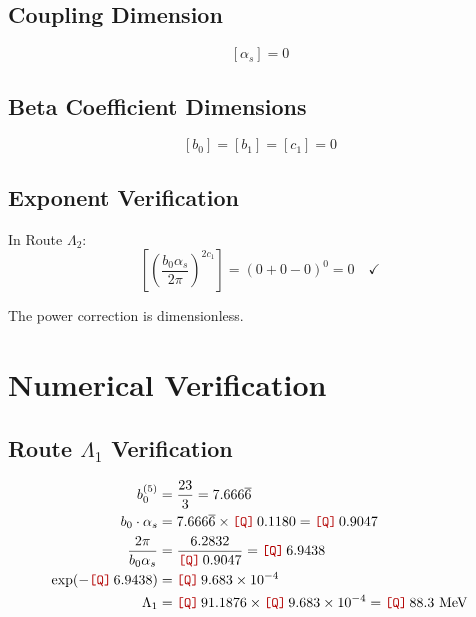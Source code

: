 \documentclass[11pt,a4paper]{article}
\newcommand{\Qnum}[1]{\textcolor{red!70!black}{\texttt{[Q]}}\,#1}
\theoremstyle{definition}
\begin{document}
\subsection{Coupling Dimension}
\label{subsec:app-dim-alpha}

\begin{equation}
\label{eq:app-dim-alpha}
[\alpha_s] = 0
\end{equation}

\subsection{Beta Coefficient Dimensions}
\label{subsec:app-dim-beta}

\begin{equation}
\label{eq:app-dim-beta}
[b_0] = [b_1] = [c_1] = 0
\end{equation}

\subsection{Exponent Verification}
\label{subsec:app-dim-exp}

In Route $\Lambda_2$:
\begin{equation}
\label{eq:app-dim-exp-check}
\left[\left(\frac{b_0\alpha_s}{2\pi}\right)^{2c_1}\right]
  = (0 + 0 - 0)^0 = 0 \quad \checkmark
\end{equation}

The power correction is dimensionless.

\section{Numerical Verification}
\label{app:numerical}

\subsection{Route $\Lambda_1$ Verification}
\label{subsec:app-lambda1-verify}

\begin{quarantinebox}
\begin{align}
\label{eq:app-num-1}
b_0^{(5)} &= \frac{23}{3} = 7.666\overline{6} \\
\label{eq:app-num-2}
b_0 \cdot \alpha_s &= 7.666\overline{6} \times \Qnum{0.1180} = \Qnum{0.9047} \\
\label{eq:app-num-3}
\frac{2\pi}{b_0\alpha_s} &= \frac{6.2832}{\Qnum{0.9047}} = \Qnum{6.9438} \\
\label{eq:app-num-4}
\exp(-\Qnum{6.9438}) &= \Qnum{9.683 \times 10^{-4}} \\
\label{eq:app-num-5}
\Lambda_1 &= \Qnum{91.1876} \times \Qnum{9.683 \times 10^{-4}} = \Qnum{88.3} \text{ MeV}
\end{align}
\end{quarantinebox}
\end{document}
